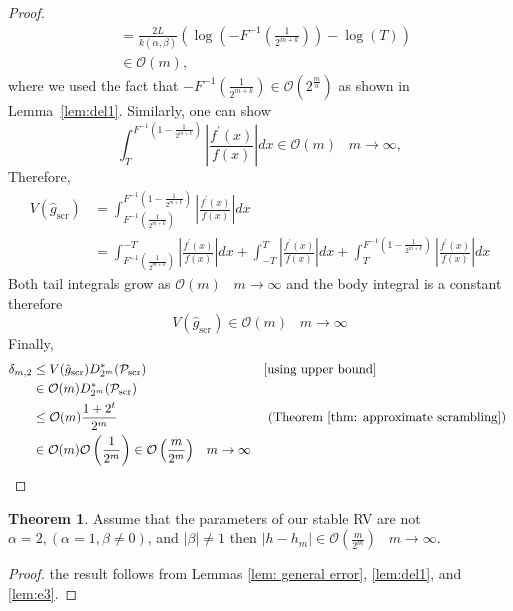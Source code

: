 \documentclass{article}
\theoremstyle{definition}
\newtheorem{theorem}[definition]{Theorem}
\begin{document}
\begin{proof}
\begin{align*}
&=\frac{2L}{k(\alpha,\beta)}\left(\log\left(-{F^{-1}\left(\frac{1}{2^{m+k}}\right)}\right)-\log(T)\right)\\
&\in \mathcal{O}\left(m\right),
\end{align*}
where we used the fact that $
    -{F^{-1}\left(\frac{1}{2^{m+k}}\right)} \in \mathcal{O}\left(2^{\frac{m}{\alpha}}\right)
$ as shown in Lemma~\ref{lem:del1}.  
Similarly, one can show
\begin{equation}
\int_{T}^{ {F^{-1}(1-\frac{1}{2^{m+k}})}} \left\lvert \frac{f^{\prime}(x)}{f(x)} \right\rvert dx \in\mathcal{O}\left(m\right)\;\;\;m\to\infty,
\end{equation}
Therefore, 
\begin{align*} 
V(\hat{g}_{\text{scr}})&= \int_{F^{-1}(\frac{1}{2^{m+k}})}^{F^{-1}(1-\frac{1}{2^{m+k}})}\left\lvert \frac{f^{\prime}(x)}{f(x)}\right\rvert dx \\
&=\int_{{F^{-1}\left(\frac{1}{2^{m+k}}\right)}}^{-T}\left\lvert \frac{f^{\prime}(x)}{f(x)} \right\rvert dx+ \int_{-T}^{T} \left\lvert \frac{f^{\prime}(x)}{f(x)} \right\rvert dx + \int_{T}^{F^{-1}\left(1-\frac{1}{2^{m+k}}\right)}\left\lvert \frac{f^{'}(x)}{f(x)} \right\rvert dx
\end{align*}
Both tail integrals grow as $\mathcal{O}(m)\;\;\;m\to\infty$ and the body integral is a constant therefore \begin{equation}
    V(\hat{g}_{\text{scr}})\in\mathcal{O}(m)\;\;\;m\to\infty
\end{equation}
Finally, 
\begin{align*} 
\delta_{m,2}&\leq V(\hat{g}_{\text{scr}})D^{\ast}_{2^m}(\mathcal{P}_{\text{scr}}) && \text{\eqref{using upper bound}}\\
&\in \mathcal{O}(m)D^{\ast}_{2^m}(\mathcal{P}_{\text{scr}})\\
&\leq \mathcal{O}(m)\frac{1+2^{t}}{2^{m}} && \text{ (Theorem \ref{thm: approximate scrambling}) }\\
&\in\mathcal{O}(m)\mathcal{O}\left(\frac{1}{2^m}\right)\in\mathcal{O}\left(\frac{m}{2^m}\right)\;\;\;m\to\infty
\end{align*}
\end{proof}
\begin{theorem}
     Assume that the parameters of our stable RV are not $\alpha=2,(\alpha=1,\beta\neq0)$, and $\lvert \beta\rvert\neq 1$ then $\lvert h-h_m\rvert\in\mathcal{O}\left(\frac{m}{2^m}\right)\;\;\;m\to\infty$.

\end{theorem}
    \begin{proof}the result follows from  Lemmas \ref{lem: general error}, \ref{lem:del1}, and \ref{lem:e3}.
    \end{proof}
\end{document}
